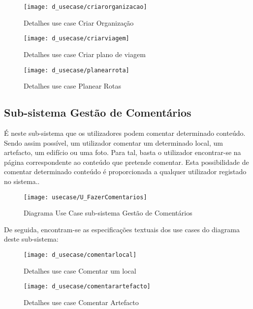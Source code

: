 \documentclass[12pt,a4paper]{article}
\begin{document}
\begin{figure}[h!]
\centering
\texttt{[image: d\_usecase/criarorganizacao]}
\label{usecase}
\caption{Detalhes use case Criar Organização}
\end{figure}

\begin{figure}[h!]
\centering
\texttt{[image: d\_usecase/criarviagem]}
\label{usecase}
\caption{Detalhes use case Criar plano de viagem}
\end{figure}

\begin{figure}[h!]
\centering
\texttt{[image: d\_usecase/planearrota]}
\label{usecase}
\caption{Detalhes use case Planear Rotas}
\end{figure}

\clearpage
\newpage

\subsection{Sub-sistema Gestão de Comentários}
É neste sub-sistema que os utilizadores podem comentar determinado conteúdo. Sendo assim possível, um utilizador comentar um determinado local, um artefacto, um edifício ou uma foto. Para tal, basta o utilizador encontrar-se na página correspondente ao conteúdo que pretende comentar. Esta possibilidade de comentar determinado conteúdo é proporcionada a qualquer utilizador registado no sistema..  \\

\begin{figure}[h!]
\centering
\texttt{[image: usecase/U\_FazerComentarios]}
\label{usecase}
\caption{Diagrama Use Case sub-sistema Gestão de Comentários}
\end{figure}

De seguida, encontram-se as especificações textuais dos use cases do diagrama deste sub-sistema:\\

\begin{figure}[h!]
\centering
\texttt{[image: d\_usecase/comentarlocal]}
\label{usecase}
\caption{Detalhes use case Comentar um local}
\end{figure}

\begin{figure}[h!]
\centering
\texttt{[image: d\_usecase/comentarartefacto]}
\label{usecase}
\caption{Detalhes use case Comentar Artefacto}
\end{figure}
\end{document}
